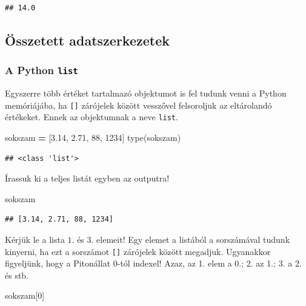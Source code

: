 \documentclass[
]{book}
\newenvironment{Shaded}{\begin{snugshade}}{\end{snugshade}}
\newcommand{\BuiltInTok}[1]{#1}
\newcommand{\DecValTok}[1]{\textcolor[rgb]{0.00,0.00,0.81}{#1}}
\newcommand{\FloatTok}[1]{\textcolor[rgb]{0.00,0.00,0.81}{#1}}
\newcommand{\NormalTok}[1]{#1}
\newcommand{\OperatorTok}[1]{\textcolor[rgb]{0.81,0.36,0.00}{\textbf{#1}}}
\begin{document}
\begin{verbatim}
## 14.0
\end{verbatim}

\subsection{Összetett adatszerkezetek}\label{uxf6sszetett-adatszerkezetek}

\subsubsection{\texorpdfstring{A Python \texttt{list}}{A Python list}}\label{a-python-list}

Egyszerre több értéket tartalmazó objektumot is fel tudunk venni a Python memóriájába, ha \texttt{{[}{]}} zárójelek között vesszővel felsoroljuk az eltárolandó értékeket. Ennek az objektumnak a neve \texttt{list}.

\begin{Shaded}
\begin{Highlighting}[]
\NormalTok{sokszam }\OperatorTok{=}\NormalTok{ [}\FloatTok{3.14}\NormalTok{, }\FloatTok{2.71}\NormalTok{, }\DecValTok{88}\NormalTok{, }\DecValTok{1234}\NormalTok{]}
\BuiltInTok{type}\NormalTok{(sokszam)}
\end{Highlighting}
\end{Shaded}

\begin{verbatim}
## <class 'list'>
\end{verbatim}

Írassuk ki a teljes listát egyben az outputra!

\begin{Shaded}
\begin{Highlighting}[]
\NormalTok{sokszam}
\end{Highlighting}
\end{Shaded}

\begin{verbatim}
## [3.14, 2.71, 88, 1234]
\end{verbatim}

Kérjük le a lista \(1.\) és \(3.\) elemeit! Egy elemet a listából a sorszámával tudunk kinyerni, ha ezt a sorszámot \texttt{{[}{]}} zárójelek között megadjuk. Ugyanakkor figyeljünk, hogy a Pitonállat \(0\)-tól indexel! Azaz, az 1. elem a 0.; 2. az 1.; 3. a 2. és stb.

\begin{Shaded}
\begin{Highlighting}[]
\NormalTok{sokszam[}\DecValTok{0}\NormalTok{]}
\end{Highlighting}
\end{Shaded}
\end{document}
